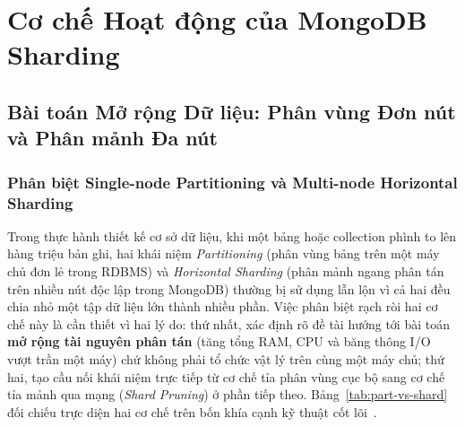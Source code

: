 \chapter{Cơ chế Hoạt động của MongoDB Sharding}
\label{chap:sharding-mechanism}

\section{Bài toán Mở rộng Dữ liệu: Phân vùng Đơn nút và Phân mảnh Đa nút}

\subsection{Phân biệt Single-node Partitioning và Multi-node Horizontal Sharding}

Trong thực hành thiết kế cơ sở dữ liệu, khi một bảng hoặc collection phình to lên hàng triệu bản ghi, hai khái niệm \textit{Partitioning} (phân vùng bảng trên một máy chủ đơn lẻ trong RDBMS) và \textit{Horizontal Sharding} (phân mảnh ngang phân tán trên nhiều nút độc lập trong MongoDB) thường bị sử dụng lẫn lộn vì cả hai đều chia nhỏ một tập dữ liệu lớn thành nhiều phần. Việc phân biệt rạch ròi hai cơ chế này là cần thiết vì hai lý do: thứ nhất, xác định rõ đề tài hướng tới bài toán \textbf{mở rộng tài nguyên phân tán} (tăng tổng RAM, CPU và băng thông I/O vượt trần một máy) chứ không phải tổ chức vật lý trên cùng một máy chủ; thứ hai, tạo cầu nối khái niệm trực tiếp từ cơ chế tỉa phân vùng cục bộ sang cơ chế tỉa mảnh qua mạng (\textit{Shard Pruning}) ở phần tiếp theo. Bảng~\ref{tab:part-vs-shard} đối chiếu trực diện hai cơ chế trên bốn khía cạnh kỹ thuật cốt lõi~\cite{Cattell2011,Kleppmann2017}.

